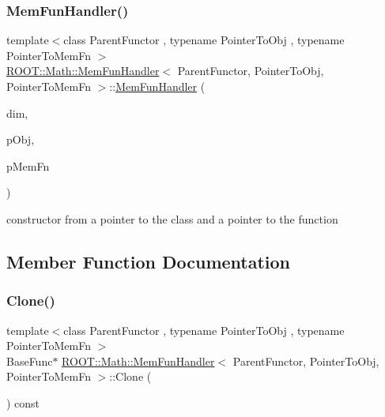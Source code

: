 \subsubsection{\texorpdfstring{MemFunHandler()}{MemFunHandler()}\hspace{0.1cm}{\footnotesize\ttfamily [4/4]}}
{\footnotesize\ttfamily template$<$class Parent\+Functor , typename Pointer\+To\+Obj , typename Pointer\+To\+Mem\+Fn $>$ \\
\mbox{\hyperlink{classROOT_1_1Math_1_1MemFunHandler}{R\+O\+O\+T\+::\+Math\+::\+Mem\+Fun\+Handler}}$<$ Parent\+Functor, Pointer\+To\+Obj, Pointer\+To\+Mem\+Fn $>$\+::\mbox{\hyperlink{classROOT_1_1Math_1_1MemFunHandler}{Mem\+Fun\+Handler}} (\begin{DoxyParamCaption}\item[{unsigned int}]{dim,  }\item[{const Pointer\+To\+Obj \&}]{p\+Obj,  }\item[{Pointer\+To\+Mem\+Fn}]{p\+Mem\+Fn }\end{DoxyParamCaption})\hspace{0.3cm}{\ttfamily [inline]}}



constructor from a pointer to the class and a pointer to the function 



\subsection{Member Function Documentation}
\mbox{\label{classROOT_1_1Math_1_1MemFunHandler_a71089a87a2f1ca482d176caca602f16c}} 
\subsubsection{\texorpdfstring{Clone()}{Clone()}\hspace{0.1cm}{\footnotesize\ttfamily [1/2]}}
{\footnotesize\ttfamily template$<$class Parent\+Functor , typename Pointer\+To\+Obj , typename Pointer\+To\+Mem\+Fn $>$ \\
Base\+Func$\ast$ \mbox{\hyperlink{classROOT_1_1Math_1_1MemFunHandler}{R\+O\+O\+T\+::\+Math\+::\+Mem\+Fun\+Handler}}$<$ Parent\+Functor, Pointer\+To\+Obj, Pointer\+To\+Mem\+Fn $>$\+::Clone (\begin{DoxyParamCaption}{ }\end{DoxyParamCaption}) const\hspace{0.3cm}{\ttfamily [inline]}}

